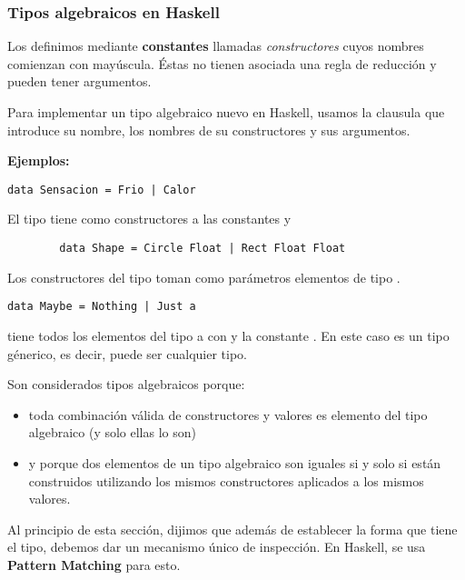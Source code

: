 \subsubsection{Tipos algebraicos en Haskell}
Los definimos mediante \textbf{constantes} llamadas \textit{constructores} cuyos nombres comienzan con mayúscula. Éstas no tienen asociada una regla de reducción y pueden tener argumentos.

Para implementar un tipo algebraico nuevo en Haskell, usamos la clausula  que introduce su nombre, los nombres de su constructores y sus argumentos.

\textbf{Ejemplos:}
\begin{centrado}
	\begin{verbatim}
data Sensacion = Frio | Calor
	\end{verbatim}
\end{centrado}

El tipo  tiene como constructores a las constantes  y 

\begin{centrado}
	\begin{verbatim}
		data Shape = Circle Float | Rect Float Float
	\end{verbatim}
\end{centrado}

Los constructores del tipo  toman como parámetros elementos de tipo .

\begin{centrado}
	\begin{verbatim}
data Maybe = Nothing | Just a
	\end{verbatim}
\end{centrado}
 tiene todos los elementos del tipo a con  y la constante . En este caso  es un tipo génerico, es decir, puede ser cualquier tipo.

\vspace*{5mm}

Son considerados tipos algebraicos porque:
\begin{itemize}
	\item toda combinación válida de constructores y valores es elemento del tipo algebraico (y solo ellas lo son)
	\item y porque dos elementos de un tipo algebraico son iguales si y solo si están construidos utilizando los mismos constructores aplicados a los mismos valores.
\end{itemize}
Al principio de esta sección, dijimos que además de establecer la forma que tiene el tipo, debemos dar un mecanismo único de inspección. En Haskell, se usa \textbf{Pattern Matching} para esto.


